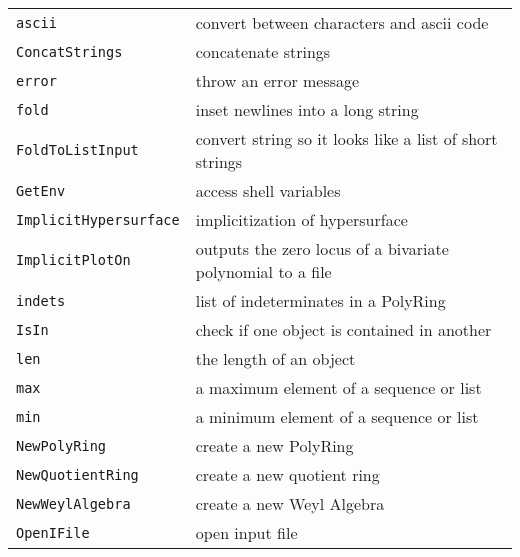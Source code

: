 \documentclass[a4paper]{mybook}
\begin{document}
\begin{center}
\begin{longtable}{ll}
   
{\verb~ascii~} &
      convert between characters and ascii code\\
   
{\verb~ConcatStrings~} &
      concatenate strings\\
   
{\verb~error~} &
      throw an error message\\
   
{\verb~fold~} &
      inset newlines into a long string\\
   
{\verb~FoldToListInput~} &
      convert string so it looks like a list of short strings\\
   
{\verb~GetEnv~} &
      access shell variables\\
   
{\verb~ImplicitHypersurface~} &
      implicitization of hypersurface\\
   
{\verb~ImplicitPlotOn~} &
      outputs the zero locus of a bivariate polynomial to a file\\
   
{\verb~indets~} &
      list of indeterminates in a PolyRing\\
   
{\verb~IsIn~} &
      check if one object is contained in another\\
   
{\verb~len~} &
      the length of an object\\
   
{\verb~max~} &
      a maximum element of a sequence or list\\
   
{\verb~min~} &
      a minimum element of a sequence or list\\
   
{\verb~NewPolyRing~} &
      create a new PolyRing\\
   
{\verb~NewQuotientRing~} &
      create a new quotient ring\\
   
{\verb~NewWeylAlgebra~} &
      create a new Weyl Algebra\\
   
{\verb~OpenIFile~} &
      open input file\\
   

\end{longtable}
\end{center}
\end{document}
